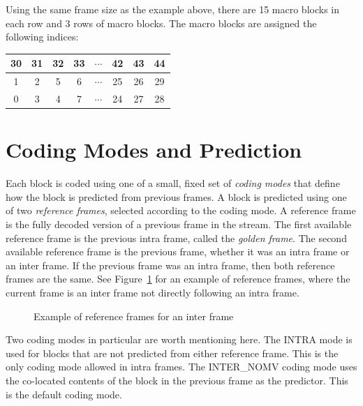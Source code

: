\documentclass[11pt,letterpaper]{book}
\newcommand{\term}[1]{{\em #1}}
\numberwithin{equation}{chapter}
\numberwithin{figure}{chapter}
\numberwithin{table}{chapter}
\begin{document}
Using the same frame size as the example above, there are 15 macro blocks in
 each row and 3 rows of macro blocks.
The macro blocks are assigned the following indices:

\vspace{\baselineskip}
\begin{center}
\begin{tabular}{|cc|cc|c|cc|c|}\hline
30 & 31 & 32 & 33 & $\cdots$ & 42 & 43 & 44 \\\hline
 1 &  2 &  5 &  6 & $\cdots$ & 25 & 26 & 29 \\
 0 &  3 &  4 &  7 & $\cdots$ & 24 & 27 & 28 \\\hline
\end{tabular}
\end{center}
\vspace{\baselineskip}

\section{Coding Modes and Prediction}

Each block is coded using one of a small, fixed set of \term{coding modes} that
 define how the block is predicted from previous frames.
A block is predicted using one of two \term{reference frames}, selected
 according to the coding mode.
A reference frame is the fully decoded version of a previous frame in the
 stream.
The first available reference frame is the previous intra frame, called the
 \term{golden frame}.
The second available reference frame is the previous frame, whether it was an
 intra frame or an inter frame.
If the previous frame was an intra frame, then both reference frames are the
 same. See Figure~\ref{fig:reference-frames} for an example of reference
 frames, where the current frame is an inter frame not directly
 following an intra frame.

\begin{figure}[htb]
\begin{center}

\end{center}
\caption{Example of reference frames for an inter frame}
\label{fig:reference-frames}
\end{figure}

Two coding modes in particular are worth mentioning here.
The INTRA mode is used for blocks that are not predicted from either reference
 frame.
This is the only coding mode allowed in intra frames.
The INTER\_NOMV coding mode uses the co-located contents of the block in the
 previous frame as the predictor.
This is the default coding mode.
\end{document}
